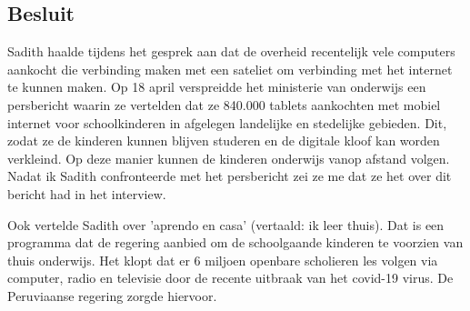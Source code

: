 \subsection{Besluit}
Sadith haalde tijdens het gesprek aan dat de overheid recentelijk vele computers aankocht die verbinding maken met een sateliet om verbinding met het internet te kunnen maken. Op 18 april verspreidde het ministerie van onderwijs een persbericht waarin ze vertelden dat ze 840.000 tablets aankochten met mobiel internet voor schoolkinderen in afgelegen landelijke en stedelijke gebieden. Dit, zodat ze de kinderen kunnen blijven studeren en de digitale kloof kan worden verkleind. Op deze manier kunnen de kinderen onderwijs vanop afstand volgen.\autocite{Minedu2020} Nadat ik Sadith confronteerde met het persbericht zei ze me dat ze het over dit bericht had in het interview. 

Ook vertelde Sadith over 'aprendo en casa' (vertaald: ik leer thuis). Dat is een programma dat de regering aanbied om de schoolgaande kinderen te voorzien van thuis onderwijs. Het klopt dat er 6 miljoen openbare scholieren les volgen via computer, radio en televisie door de recente uitbraak van het covid-19 virus. De Peruviaanse regering zorgde hiervoor. \autocite{Minedu2020a}


